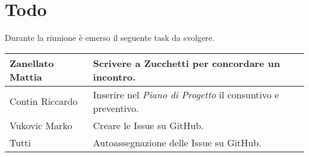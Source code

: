 \section{Todo}
Durante la riunione è emerso il seguente task da svolgere.

\begin{center}
  \begin{tabular}{|p{5cm}|p{7cm}|}
    \hline
    Zanellato Mattia & Scrivere a Zucchetti per concordare un incontro. \\ \hline
    Contin Riccardo & Inserire nel \textit{Piano di Progetto} il consuntivo e preventivo. \\ \hline
    Vukovic Marko & Creare le Issue su GitHub. \\ \hline
    Tutti & Autoassegnazione delle Issue su GitHub. \\ \hline
  \end{tabular}
\end{center}
